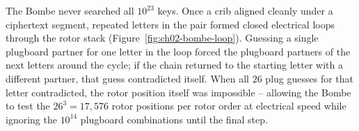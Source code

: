 \begin{intuitionbox}
The Bombe never searched all $10^{23}$ keys. Once a crib aligned cleanly under a ciphertext
segment, repeated letters in the pair formed closed electrical loops through the rotor stack
(Figure~\ref{fig:ch02-bombe-loop}). Guessing a single plugboard partner for one letter in the
loop forced the plugboard partners of the next letters around the cycle; if the chain returned
to the starting letter with a different partner, that guess contradicted itself. When all $26$
plug guesses for that letter contradicted, the rotor position itself was impossible -- allowing
the Bombe to test the $26^3 = 17{,}576$ rotor positions per rotor order at electrical speed
while ignoring the $10^{14}$ plugboard combinations until the final step.
\end{intuitionbox}

